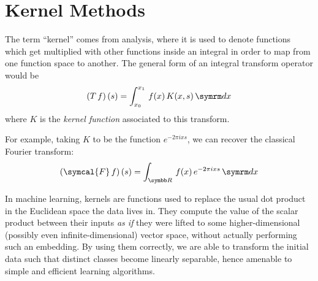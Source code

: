 




\section{Kernel Methods}

The term ``kernel'' comes from analysis, where it is used to denote functions which get multiplied with other functions inside an integral in order to map from one function space to another. The general form of an integral transform operator would be
\[
    \left(T \, f\right) (s) = \int_{x_0}^{x_1} \, f(x) \, K(x, s) \diff x
\]
where \(K\) is the \emph{kernel function} associated to this transform.

For example, taking \(K\) to be the function \(e^{-2 \pi i x s}\), we can recover the classical Fourier transform:
\[
    \left(\symcal{F} \, f\right) (s) = \int_{\reals} \, f(x) \, e^{-2 \pi i x s} \diff x
\]



In machine learning, kernels are functions used to replace the usual dot product in the Euclidean space the data lives in. They compute the value of the scalar product between their inputs \emph{as if} they were lifted to some higher-dimensional (possibly even infinite-dimensional) vector space, without actually performing such an embedding. By using them correctly, we are able to transform the initial data such that distinct classes become linearly separable, hence amenable to simple and efficient learning algorithms.

